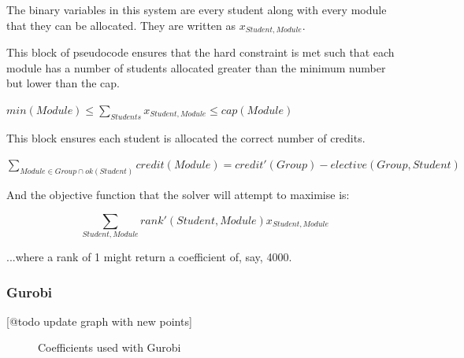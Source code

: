 The binary variables in this system are every student along with every module
that they can be allocated. They are written as $x_{Student,Module}$.

This block of pseudocode ensures that the hard constraint is met such that
each module has a number of students allocated greater than the minimum number
but lower than the cap.

\begin{algorithmic}
  \STATE $min(Module) \leq \displaystyle\sum_{Students}x_{Student,Module} \leq cap(Module)$
\ENDFOR
\end{algorithmic}

This block ensures each student is allocated the correct number of credits.

\begin{algorithmic}
    \STATE $\displaystyle\sum_{Module \in Group \cap ok(Student)} credit(Module) = credit'(Group) - elective(Group,Student)$
  \ENDFOR
\ENDFOR
\end{algorithmic}

And the objective function that the solver will attempt to maximise is:

$$\displaystyle\sum_{Student, Module} rank'(Student, Module)x_{Student, Module}$$

...where a rank of 1 might return a coefficient of, say, 4000.

\subsubsection{Gurobi}

[@todo update graph with new points]


\begin{figure}
  \begin{center}
  \end{center}
  \caption{Coefficients used with Gurobi}
  \label{gurobi_coeff}
\end{figure}

